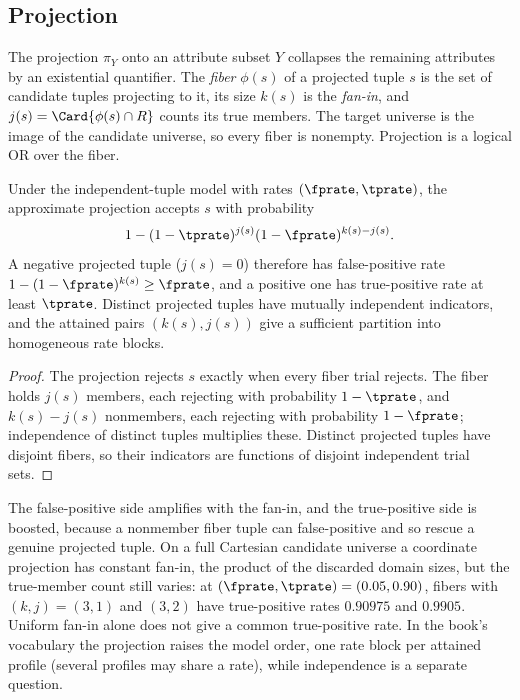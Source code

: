 \subsection*{Projection}

The projection $\pi_Y$ onto an attribute subset $Y$ collapses
the remaining attributes by an existential quantifier. The \emph{fiber}
$\phi(s)$ of a projected tuple $s$ is the set of candidate tuples projecting to
it, its size $k(s)$ is the \emph{fan-in}, and $j(s) = \Card{\phi(s) \cap R}$
counts its true members. The target universe is the image of the candidate
universe, so every fiber is nonempty. Projection is a logical OR over the fiber.

\begin{theorem}[Projection]
\label{thm:projection-rates}
Under the independent-tuple model with rates $(\fprate, \tprate)$, the
approximate projection accepts $s$ with probability
\[
  1 - (1 - \tprate)^{j(s)} (1 - \fprate)^{k(s) - j(s)}.
\]
A negative projected tuple ($j(s) = 0$) therefore has false-positive rate $1 -
(1 - \fprate)^{k(s)} \ge \fprate$, and a positive one has true-positive rate at
least $\tprate$. Distinct projected tuples have mutually independent indicators,
and the attained pairs $(k(s), j(s))$ give a sufficient partition into
homogeneous rate blocks.
\end{theorem}

\begin{proof}
The projection rejects $s$ exactly when every fiber trial rejects. The fiber
holds $j(s)$ members, each rejecting with probability $1 - \tprate$, and $k(s) -
j(s)$ nonmembers, each rejecting with probability $1 - \fprate$; independence of
distinct tuples multiplies these. Distinct projected tuples have disjoint fibers,
so their indicators are functions of disjoint independent trial sets.
\end{proof}

The false-positive side amplifies with the fan-in, and the true-positive side is
boosted, because a nonmember fiber tuple can false-positive and so rescue a
genuine projected tuple. On a full Cartesian candidate universe a coordinate
projection has constant fan-in, the product of the discarded domain sizes, but
the true-member count still varies: at $(\fprate, \tprate) = (0.05, 0.90)$,
fibers with $(k, j) = (3, 1)$ and $(3, 2)$ have true-positive rates $0.90975$ and
$0.9905$. Uniform fan-in alone does not give a common true-positive rate. In the
book's vocabulary the projection raises the model order, one
rate block per attained profile (several profiles may share a rate), while
independence is a separate question.


